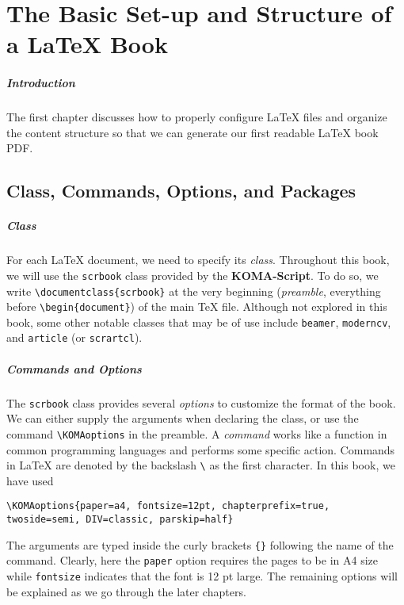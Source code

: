 \chapter{The Basic Set-up and Structure of a \LaTeX{} Book}

\paragraph{Introduction}
The first chapter discusses how to properly configure \LaTeX{} files and organize the content structure so that we can generate our first readable \LaTeX{} book PDF. 

\section{Class, Commands, Options, and Packages}
\label{sec:komaopt}

\paragraph{Class}
For each \LaTeX{} document, we need to specify its \textit{class}. Throughout this book, we will use the \verb|scrbook| class provided by the \textbf{KOMA-Script}. To do so, we write \texttt{\textbackslash documentclass\{scrbook\}} at the very beginning (\textit{preamble}, everything before \texttt{\textbackslash begin\{document\}}) of the main \TeX{} file. Although not explored in this book, some other notable classes that may be of use include \verb|beamer|, \verb|moderncv|, and \verb|article| (or \verb|scrartcl|).

\paragraph{Commands and Options}
The \verb|scrbook| class provides several \textit{options} to customize the format of the book. We can either supply the arguments when declaring the class, or use the command \texttt{\textbackslash KOMAoptions} in the preamble. A \textit{command} works like a function in common programming languages and performs some specific action. Commands in \LaTeX{} are denoted by the backslash \verb|\| as the first character. In this book, we have used
\begin{lstlisting}
\KOMAoptions{paper=a4, fontsize=12pt, chapterprefix=true, twoside=semi, DIV=classic, parskip=half}
\end{lstlisting}
The arguments are typed inside the curly brackets \verb|{}| following the name of the command. Clearly, here the \verb|paper| option requires the pages to be in A4 size while \verb|fontsize| indicates that the font is 12 pt large. The remaining options will be explained as we go through the later chapters.

